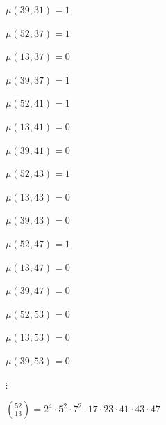 \documentclass{article}
\begin{document}
\( \mu(39,31) = 1 \)

\( \mu(52,37) = 1 \)

\( \mu(13,37) = 0 \)

\( \mu(39,37) = 1 \)

\( \mu(52,41) = 1 \)

\( \mu(13,41) = 0 \)

\( \mu(39,41) = 0 \)

\( \mu(52,43) = 1 \)

\( \mu(13,43) = 0 \)

\( \mu(39,43) = 0 \)

\( \mu(52,47) = 1 \)

\( \mu(13,47) = 0 \)

\( \mu(39,47) = 0 \)

\( \mu(52,53) = 0 \)

\( \mu(13,53) = 0 \)

\( \mu(39,53) = 0 \)

\( \vdots \)

\( \binom{52}{13} = 2^4 \cdot 5^2 \cdot 7^2 \cdot 17 \cdot 23 \cdot 41 \cdot 43 \cdot 47 \)
\end{document}
